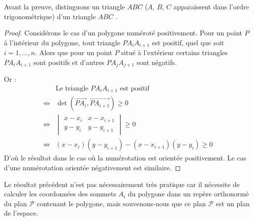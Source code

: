 \documentclass[11pt,class=report,crop=false]{standalone}
\begin{document}
\begin{center}
	\begin{minipage}{0.45\textwidth}
	\end{minipage}\quad
	\begin{minipage}{0.45\textwidth}
	\end{minipage}
\end{center}



Avant la preuve, distinguons un triangle $ABC$  ($A$, $B$, $C$ apparaissent dans l'ordre trigonométrique) d'un triangle $ABC$ .
\begin{center}
	\begin{minipage}{0.45\textwidth}
	\end{minipage}\quad
	\begin{minipage}{0.45\textwidth}
	\end{minipage}
\end{center}


\begin{proof}
Considérons le cas d'un polygone numéroté positivement.
Pour un point $P$ à l'intérieur du polygone, tout triangle $PA_iA_{i+1}$ est positif, quel que soit $i=1,\ldots,n$.
Alors que pour un point $P$ situé à l'extérieur certains triangles $PA_iA_{i+1}$ sont positifs et d'autres $PA_jA_{j+1}$ sont négatifs.

Or :
\begin{align*}
& \text{Le triangle } PA_iA_{i+1} \text{ est positif } \\
 \iff &\det( \vec{PA_i},\vec{PA_{i+1}} ) \ge 0 \\
 \iff & 
\begin{vmatrix} 
x-x_i & x-x_{i+1} \\ 
y-y_i & y-y_{i+1} 
\end{vmatrix} \ge 0 \\
\iff & (x-x_i)(y-y_{i+1}) - (x-x_{i+1})(y-y_i) \ge 0
\end{align*}
D'où le résultat dans le cas où la numérotation est orientée positivement. Le cas d'une numérotation orientée négativement est similaire.
\end{proof}

Le résultat précédent n'est pas nécessairement très pratique car il nécessite de calculer les coordonnées des sommets $A_i$ du polygone dans un repère orthonormé du plan $\mathcal{P}$ contenant le polygone, mais souvenons-nous que ce plan $\mathcal{P}$ est un plan de l'espace.
\end{document}
